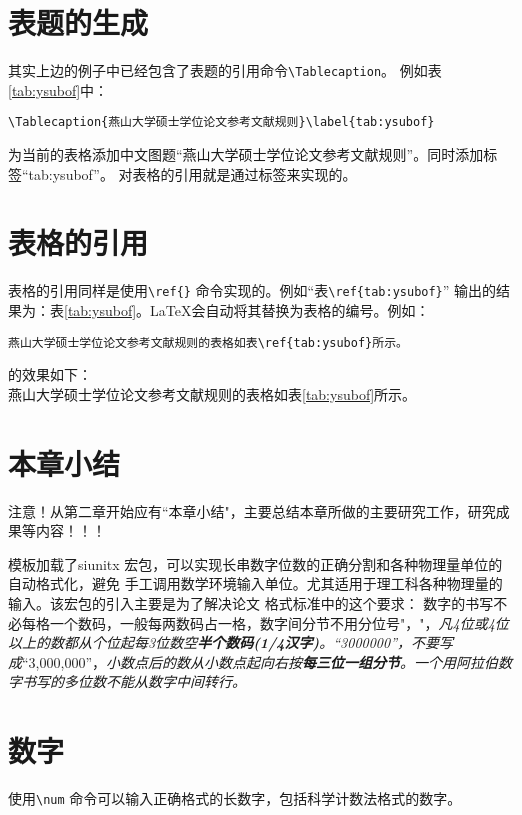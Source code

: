 \section{表题的生成}\label{section3-4}
其实上边的例子中已经包含了表题的引用命令\verb|\Tablecaption|。
例如表\ref{tab:ysubof}中：
\begin{verbatim}
\Tablecaption{燕山大学硕士学位论文参考文献规则}\label{tab:ysubof}
\end{verbatim}
为当前的表格添加中文图题“燕山大学硕士学位论文参考文献规则”。同时添加标签“tab:ysubof”。 对表格的引用就是通过标签来实现的。

\section{表格的引用}\label{section3-5}
表格的引用同样是使用\verb|\ref{}| 命令实现的。例如“表\verb|\ref{tab:ysubof}|” 输出的结果为：表\ref{tab:ysubof}。\LaTeX 会自动将其替换为表格的编号。例如：
\begin{verbatim}
燕山大学硕士学位论文参考文献规则的表格如表\ref{tab:ysubof}所示。
\end{verbatim}
的效果如下：\\
燕山大学硕士学位论文参考文献规则的表格如表\ref{tab:ysubof}所示。

\section{本章小结}\label{section3-5}
注意！从第二章开始应有``本章小结"，主要总结本章所做的主要研究工作，研究成果等内容！！！

%




\label{chap:unit}
模板加载了siunitx 宏包，可以实现长串数字位数的正确分割和各种物理量单位的自动格式化，避免
手工调用数学环境输入单位。尤其适用于理工科各种物理量的输入。该宏包的引入主要是为了解决论文
格式标准中的这个要求：
数字的书写不必每格一个数码，一般每两数码占一格，数字间分节不用分位号"，"，\emph{凡4位或4位以上的数都从个位起每3位数空\textbf{半个数码(1/4汉字)}。“\num{3 000000}”，不要写成}“3,000,000”，\emph{小数点后的数从小数点起向右按\textbf{每三位一组分节}。一个用阿拉伯数字书写的多位数不能从数字中间转行。}

\section{数字}\label{section7-1}
使用\verb|\num| 命令可以输入正确格式的长数字，包括科学计数法格式的数字。

